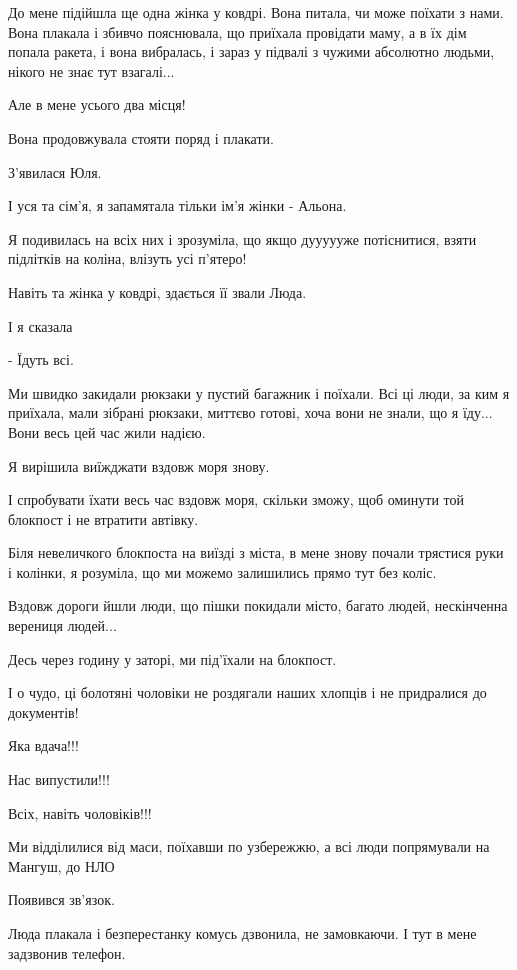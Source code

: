 До мене підійшла ще одна жінка у ковдрі. Вона питала, чи може поїхати з нами.
Вона плакала і збивчо пояснювала, що приїхала провідати маму, а в їх дім попала
ракета, і вона вибралась, і зараз у підвалі з чужими абсолютно людьми, нікого
не знає тут взагалі...

Але в мене усього два місця!

Вона продовжувала стояти поряд  і плакати.

З'явилася Юля. 

І уся та сім'я, я запамятала тільки ім'я жінки - Альона.

Я подивилась на всіх них і зрозуміла, що якщо дуууууже потіснитися, взяти
підлітків на коліна, влізуть усі п'ятеро!


Навіть та жінка у ковдрі, здається її звали Люда.

І я сказала

- Їдуть всі.

Ми швидко закидали рюкзаки у пустий багажник і поїхали. Всі ці люди, за ким я
приїхала, мали зібрані рюкзаки,  миттєво готові, хоча вони не знали, що я
їду... Вони весь цей час жили надією.

Я вирішила виїжджати вздовж моря знову.

І спробувати їхати весь час вздовж моря, скільки зможу, щоб оминути той
блокпост і не втратити автівку.

Біля невеличкого блокпоста на виїзді з міста, в мене знову почали трястися руки
і колінки, я розуміла,  що ми можемо залишились прямо тут без коліс.

Вздовж дороги йшли люди, що пішки покидали місто, багато людей, нескінченна
верениця людей...

Десь через годину у заторі,  ми під'їхали на блокпост.


І о чудо, ці болотяні чоловіки не роздягали наших хлопців і не придралися до
документів! 

Яка вдача!!! 

Нас випустили!!!

Всіх, навіть чоловіків!!!

Ми відділилися від маси, поїхавши по узбережжю, а всі люди попрямували на
Мангуш, до НЛО

Появився зв'язок. 

Люда плакала і безперестанку комусь дзвонила, не замовкаючи. І тут в мене
задзвонив телефон. 

